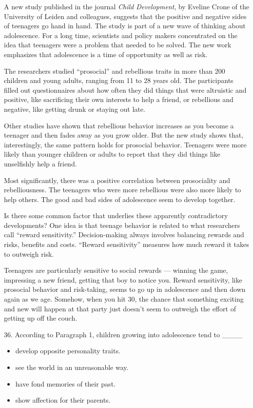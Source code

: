 \documentclass[UTF8,11pt]{ctexart}
\begin{document}
A new study published in the journal \textit{Child Development}, by Eveline Crone of the University of Leiden and colleagues, suggests that the positive and negative sides of teenagers go hand in hand. The study is part of a new wave of thinking about adolescence. For a long time, scientists and policy makers concentrated on the idea that teenagers were a problem that needed to be solved. The new work emphasizes that adolescence is a time of opportunity as well as risk.


The researchers studied “prosocial” and rebellious traits in more than 200 children and young adults, ranging from 11 to 28 years old. The participants filled out questionnaires about how often they did things that were altruistic and positive, like sacrificing their own interests to help a friend, or rebellious and negative, like getting drunk or staying out late.


Other studies have shown that rebellious behavior increases as you become a teenager and then fades away as you grow older. But the new study shows that, interestingly, the same pattern holds for prosocial behavior. Teenagers were more likely than younger children or adults to report that they did things like unselfishly help a friend.


Most significantly, there was a positive correlation between prosociality and rebelliousness. The teenagers who were more rebellious were also more likely to help others. The good and bad sides of adolescence seem to develop together.


Is there some common factor that underlies these apparently contradictory developments? One idea is that teenage behavior is related to what researchers call “reward sensitivity.” Decision-making always involves balancing rewards and risks, benefits and costs. “Reward sensitivity” measures how much reward it takes to outweigh risk.


Teenagers are particularly sensitive to social rewards — winning the game, impressing a new friend, getting that boy to notice you. Reward sensitivity, like prosocial behavior and risk-taking, seems to go up in adolescence and then down again as we age. Somehow, when you hit 30, the chance that something exciting and new will happen at that party just doesn’t seem to outweigh the effort of getting up off the couch.


36. According to Paragraph 1, children growing into adolescence tend to \_\_\_\_


\begin{itemize}[leftmargin=2em,itemsep=.2em,topsep=.4em]\item[A.] develop opposite personality traits.
\item[B.] see the world in an unreasonable way.
\item[C.] have fond memories of their past.
\item[D.] show affection for their parents.
\end{itemize}
\end{document}
